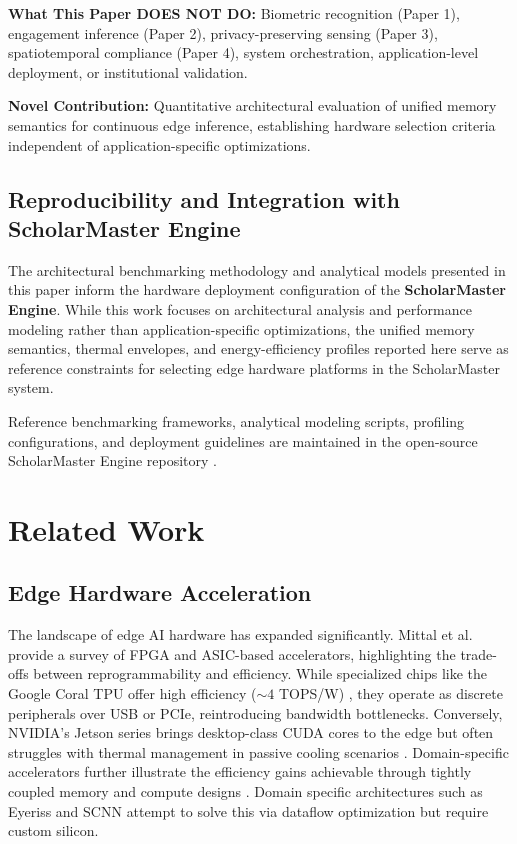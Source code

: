 \documentclass[conference]{IEEEtran}
\begin{document}
\textbf{What This Paper DOES NOT DO:}
Biometric recognition (Paper 1), engagement inference (Paper 2), privacy-preserving sensing (Paper 3), spatiotemporal compliance (Paper 4), system orchestration, application-level deployment, or institutional validation.

\textbf{Novel Contribution:} Quantitative architectural evaluation of unified memory semantics for continuous edge inference, establishing hardware selection criteria independent of application-specific optimizations.

\subsection{Reproducibility and Integration with ScholarMaster Engine}
The architectural benchmarking methodology and analytical models presented in this paper inform the hardware deployment configuration of the \textbf{ScholarMaster Engine}. While this work focuses on architectural analysis and performance modeling rather than application-specific optimizations, the unified memory semantics, thermal envelopes, and energy-efficiency profiles reported here serve as reference constraints for selecting edge hardware platforms in the ScholarMaster system.

Reference benchmarking frameworks, analytical modeling scripts, profiling configurations, and deployment guidelines are maintained in the open-source ScholarMaster Engine repository \cite{scholarmaster_repo}.

\section{Related Work}

\subsection{Edge Hardware Acceleration}
The landscape of edge AI hardware has expanded significantly. Mittal et al. \cite{b3} provide a survey of FPGA and ASIC-based accelerators, highlighting the trade-offs between reprogrammability and efficiency. While specialized chips like the Google Coral TPU offer high efficiency ($\sim 4$ TOPS/W) \cite{b7}, they operate as discrete peripherals over USB or PCIe, reintroducing bandwidth bottlenecks. Conversely, NVIDIA's Jetson series brings desktop-class CUDA cores to the edge but often struggles with thermal management in passive cooling scenarios \cite{b21}. Domain-specific accelerators further illustrate the efficiency gains achievable through tightly coupled memory and compute designs \cite{b25}. Domain specific architectures such as Eyeriss \cite{b26} and SCNN \cite{b27} attempt to solve this via dataflow optimization but require custom silicon.
\end{document}
